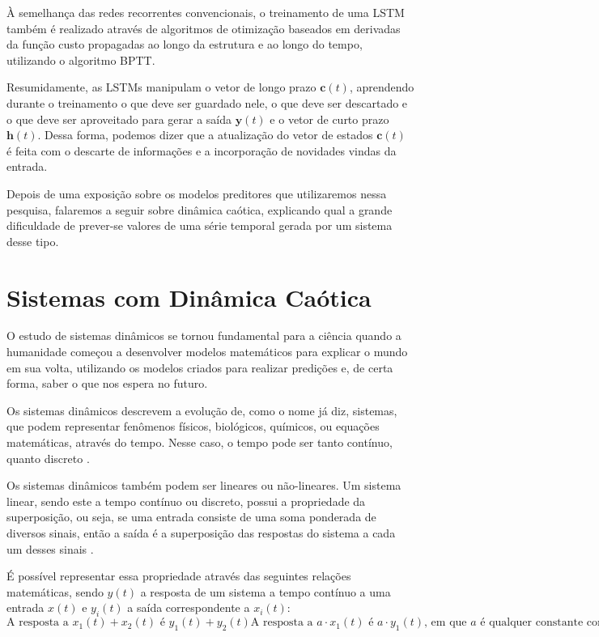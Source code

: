 \documentclass[a4paper, 12pt]{article}
\begin{document}
À semelhança das redes recorrentes convencionais, o treinamento de uma LSTM também é realizado através de algoritmos de otimização baseados em derivadas da função custo propagadas ao longo da estrutura e ao longo do tempo, utilizando o algoritmo BPTT.

Resumidamente, as LSTMs manipulam o vetor de longo prazo $\mathbf{c}(t)$, aprendendo durante o treinamento o que deve ser guardado nele, o que deve ser descartado e o que deve ser aproveitado para gerar a saída $\mathbf{y}(t)$ e o vetor de curto prazo $\mathbf{h}(t)$. Dessa forma, podemos dizer que a atualização do vetor de estados $\mathbf{c}(t)$ é feita com o descarte de informações e a incorporação de novidades vindas da entrada.

Depois de uma exposição sobre os modelos preditores que utilizaremos nessa pesquisa, falaremos a seguir sobre dinâmica caótica, explicando qual a grande dificuldade de prever-se valores de uma série temporal gerada por um sistema desse tipo.

\section{Sistemas com Dinâmica Caótica}
O estudo de sistemas dinâmicos se tornou fundamental para a ciência quando a humanidade começou a desenvolver modelos matemáticos para explicar o mundo em sua volta, utilizando os modelos criados para realizar predições e, de certa forma, saber o que nos espera no futuro.

Os sistemas dinâmicos descrevem a evolução de, como o nome já diz, sistemas, que podem representar fenômenos físicos, biológicos, químicos, ou equações matemáticas, através do tempo. Nesse caso, o tempo pode ser tanto contínuo, quanto discreto \cite{kluever2020dynamic}.

Os sistemas dinâmicos também podem ser lineares ou não-lineares. Um sistema linear, sendo este a tempo contínuo ou discreto, possui a propriedade da superposição, ou seja, se uma entrada consiste de uma soma ponderada de diversos sinais, então a saída é a superposição das respostas do sistema a cada um desses sinais \cite{oppenheim2014signals}. 

É possível representar essa propriedade através das seguintes relações matemáticas, sendo $y(t)$ a resposta de um sistema a tempo contínuo a uma entrada $x(t)$ e $y_i(t)$ a saída correspondente a $x_i(t)$:
\begin{subequations}
\begin{equation}\label{eq:linear-eq-1}
\text{A resposta a } x_1(t) + x_2(t) \text{ é } y_1(t) + y_2(t)
\end{equation}
\begin{equation}\label{eq:linear-eq-2}
\text{A resposta a } a\cdot x_1(t) \text{ é } a\cdot y_1(t)\text{, em que } a \text{ é qualquer constante complexa.}
\end{equation}
\end{subequations}
\end{document}
